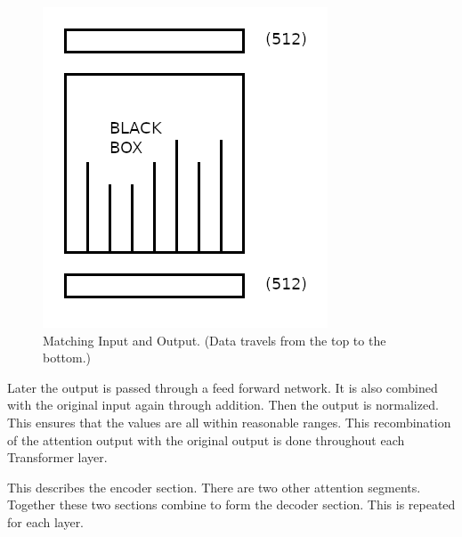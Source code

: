 \begin{figure}[H]
	\begin{center}
		
	
	\includegraphics[scale=0.5]{diagram-mat02}
\end{center}
	\caption[Matching Input and Output]{Matching Input and Output. (Data travels from the top to the bottom.)}
	\label{attention-matching}

\end{figure}


Later the output is passed through a feed forward network. It is also combined with the original input again through addition. Then the output is normalized. This ensures that the values are all within reasonable ranges. This recombination of the attention output with the original output is done throughout each Transformer layer.

This describes the encoder section. There are two other attention segments. Together these two sections combine to form the decoder section. This is repeated for each layer.

